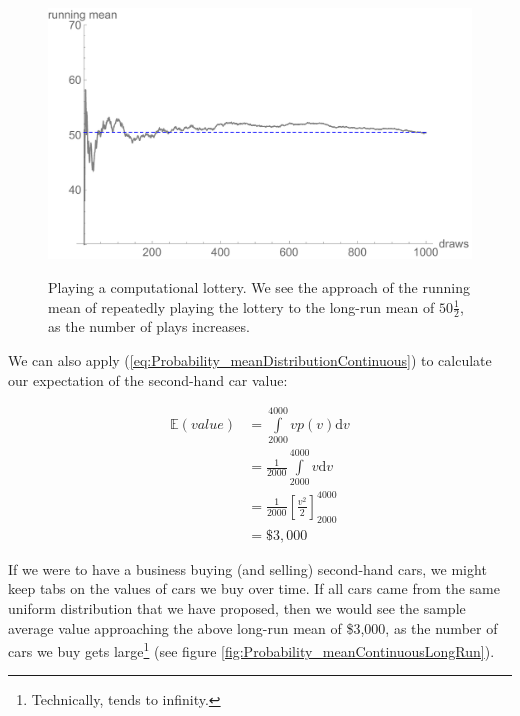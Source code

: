 \documentclass[11pt,fullpage]{book}
\begin{document}
\begin{figure}
\centering
\scalebox{0.55} 
{\includegraphics{Probability_meanDiscreteLongRun.pdf}}
\caption{Playing a computational lottery. We see the approach of the running mean of repeatedly playing the lottery to the long-run mean of $50\tfrac{1}{2}$, as the number of plays increases.}\label{fig:Probability_meanDiscreteLongRun}
\end{figure}

We can also apply (\ref{eq:Probability_meanDistributionContinuous}) to calculate our expectation of the second-hand car value:

\begin{align}\label{eq:Probability_meanCoinContinuous}
\mathbb{E}(value) &= \int\limits_{2000}^{4000} v p(v)\mathrm{d}v\\
&=\frac{1}{2000} \int\limits_{2000}^{4000} v \mathrm{d}v\\
&= \frac{1}{2000}\left[\frac{v^2}{2}\right]^{4000}_{2000}\\ 
&= \$3,000
\end{align}

If we were to have a business buying (and selling) second-hand cars, we might keep tabs on the values of cars we buy over time. If all cars came from the same uniform distribution that we have proposed, then we would see the sample average value approaching the above long-run mean of \$3,000, as the number of cars we buy gets large\footnote{Technically, tends to infinity.} (see figure \ref{fig:Probability_meanContinuousLongRun}).
\end{document}
